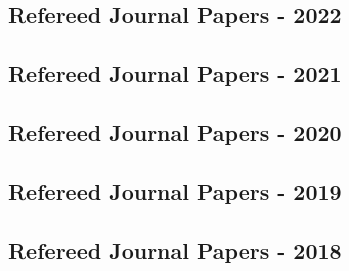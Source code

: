 \documentclass[11pt,a4paper,]{moderncv}
\begin{document}
\hypertarget{refs_journalspress}{}

\vspace{7mm}

\hypertarget{refereed-journal-papers---2022}{%
\subsection{\texorpdfstring{\textbf{Refereed Journal Papers -
2022}}{Refereed Journal Papers - 2022}}\label{refereed-journal-papers---2022}}

\hypertarget{refs_journals2022}{}

\hypertarget{refereed-journal-papers---2021}{%
\subsection{\texorpdfstring{\textbf{Refereed Journal Papers -
2021}}{Refereed Journal Papers - 2021}}\label{refereed-journal-papers---2021}}

\hypertarget{refs_journals2021}{}

\vspace{7mm}

\hypertarget{refereed-journal-papers---2020}{%
\subsection{\texorpdfstring{\textbf{Refereed Journal Papers -
2020}}{Refereed Journal Papers - 2020}}\label{refereed-journal-papers---2020}}

\hypertarget{refs_journals2020}{}

\vspace{7mm}

\hypertarget{refereed-journal-papers---2019}{%
\subsection{\texorpdfstring{\textbf{Refereed Journal Papers -
2019}}{Refereed Journal Papers - 2019}}\label{refereed-journal-papers---2019}}

\hypertarget{refs_journals2019}{}

\vspace{7mm}

\hypertarget{refereed-journal-papers---2018}{%
\subsection{\texorpdfstring{\textbf{Refereed Journal Papers -
2018}}{Refereed Journal Papers - 2018}}\label{refereed-journal-papers---2018}}
\end{document}
